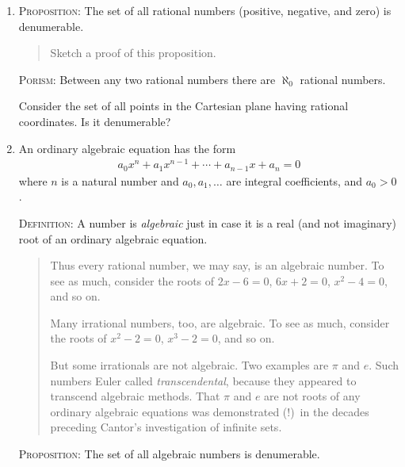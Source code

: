 \documentclass[polutonikogreek,english,twoside,openright]{article}
\begin{document}
\begin{enumerate}
\begin{enumerate}[(1)]
\begin{align*}
      1,  2,  \tfrac{1}{2}, \tfrac{1}{3}, 3, 4, \tfrac{3}{2},
      \tfrac{2}{3}, \tfrac{1}{4}, \ldots.
    \end{align*}
  \item There is a 1--1 correspondence between all these rationals and
    the natural numbers.
  \item Therefore, the set of all rationals $>0$ has the same
    cardinality as the set of all natural numbers.
  \item Therefore, the set of all rationals $>0$ is denumerable.
  \end{enumerate}
\item \textsc{Proposition}\label{ratden}: The set of all rational
  numbers (positive, negative, and zero) is denumerable.
  \begin{quotation} {\small Sketch a proof of this proposition.
    }\end{quotation}
  \textsc{Porism}: Between any two rational numbers there are
  $\aleph_0$ rational numbers.

  Consider the set of all points in the Cartesian plane having
  rational coordinates. Is it denumerable?\label{rationalcoordinates}
\item An ordinary algebraic equation has the form
  \begin{align*}
    a_0x^n+a_1x^{n-1}+\dotsb+a_{n-1}x+a_n=0
  \end{align*}
  where $n$ is a natural number and $a_0, a_1, \dotsc$ are integral
  coefficients, and $a_0>0$.

  \textsc{Definition}: A number is \emph{algebraic} just in case it is
  a real (and not imaginary) root of an ordinary algebraic equation.
\begin{quote}
{\small Thus every rational number, we may say, is an algebraic number. To see as much, consider the roots of $2x-6=0$, $6x+2=0$, $x^2-4=0$, and so on.

Many irrational numbers, too, are algebraic. To see as much, consider the roots of $x^2-2=0$,  $x^3-2=0$, and so on.

But some irrationals are not algebraic. Two examples are $\pi$ and
$e$. Such numbers Euler called \emph{transcendental}, because they
appeared to transcend algebraic methods. That $\pi$ and $e$ are not
roots of any ordinary algebraic equations was demonstrated (!)\ in the
decades preceding Cantor's investigation of infinite sets.}
\end{quote}
\textsc{Proposition}: The set of all algebraic numbers is
denumerable.\label{algden}


\end{enumerate}
\end{document}

